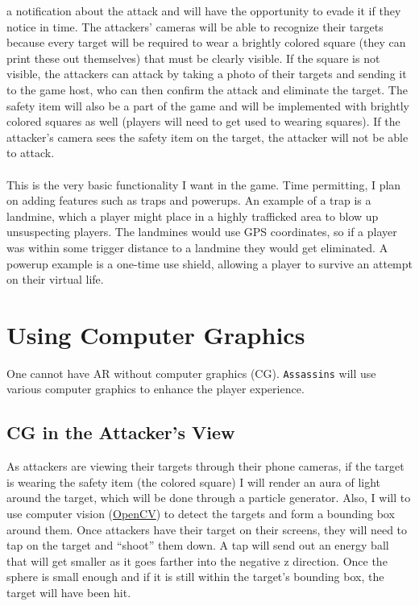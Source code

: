 \documentclass{article}
\begin{document}
a notification about the attack and will have the opportunity 
to evade it if they notice in time. The attackers' cameras will be able to
recognize their targets because every target will be required to 
wear a brightly colored square (they can print these out themselves)
that must be clearly visible. If the square is not visible, the attackers
can attack by taking a photo of their targets and sending it to the game host, who can 
then confirm the attack and eliminate the target. The safety item will also
be a part of the game and will be implemented with brightly colored 
squares as well (players will need to get used to wearing squares).
If the attacker's camera sees the safety item on the target, 
the attacker will not be able to attack.
\\\\
This is the very basic functionality I want in the game. Time permitting,
I plan on adding features such as traps and powerups. An example of a trap
is a landmine, which a player might place in a highly trafficked area
to blow up unsuspecting players. The landmines would use GPS
coordinates, so if a player was within some trigger distance to a landmine they would
get eliminated. A powerup example is a one-time use shield, allowing a player to survive
an attempt on their virtual life.

\section{Using Computer Graphics}
One cannot have AR without computer graphics (CG). \texttt{Assassins} will use various computer 
graphics to enhance the player experience. 
\subsection{CG in the Attacker's View}
As attackers are viewing their targets through their phone cameras, if the target is wearing the
safety item (the colored square) I will render an aura of light around the target,
which will be done through a particle generator.
Also, I will to use computer vision (\href{http://opencv.org/}{OpenCV}) to detect the 
targets and form a bounding box around them. 
Once attackers have their target on their screens, they will need to tap 
on the target and ``shoot'' them down.
A tap will send out an energy ball that will get
smaller as it goes farther into the negative z direction. Once the 
sphere is small enough and if it is still within the target's bounding box,
the target will have been hit.
\end{document}
